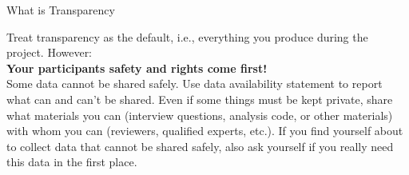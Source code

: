 \begin{block}{What is Transparency}
      
 
  

 
  
 
  
  Treat transparency as the default, i.e., everything you produce during the project. However:\\
  \textbf{Your participants safety and rights come first!} \\
  Some data cannot be shared safely. Use data availability statement to report what can and can't be shared. Even if some things must be kept private, share   what materials you can (interview questions, analysis code, or other materials) with whom you can (reviewers, qualified experts, etc.). If you find yourself about to collect data that cannot be shared safely, also ask yourself if you really need this data in the first place.


\end{block}
